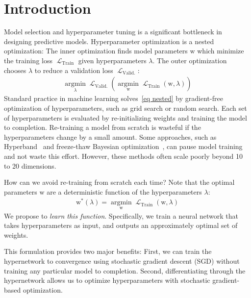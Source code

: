 \documentclass{article} %
\newcommand{\argmin}{\mathop{\mathrm{argmin}}\limits}
\newcommand{\param}{\mathrm{w}} %
\newcommand{\hyper}{\lambda} %
\newcommand{\hyperHyper}{\hyper'} %
\newcommand{\innerOptParam}[1]{\param^{*} \! \left( #1 \right)} %
\newcommand{\lossSymbol}{\mathop{\mathcal{L}}} %
\newcommand{\lossSymbolInner}{\lossSymbol_{\mathrm{Train}}} %
\newcommand{\lossSymbolOuter}{\lossSymbol_{\mathrm{Valid.}}} %
\newcommand{\innerLoss}[2]{\lossSymbolInner \! \left( #1, #2 \right)} %
\newcommand{\innerOpt}{\argmin_{\param} \innerLoss{\param}{\hyper}} %
\newcommand{\outerLoss}[1]{\lossSymbolOuter \! \left( #1 \right)}%
\newcommand{\outerOpt}[1]{\argmin_{\hyper} \outerLoss{#1}} %
\begin{document}
\section{Introduction}
Model selection and hyperparameter tuning is a significant bottleneck in designing predictive models.
Hyperparameter optimization is a nested optimization:
The inner optimization finds model parameters $\param$ which minimize the training loss $\lossSymbolInner$ given hyperparameters $\hyper$.
The outer optimization chooses $\hyper$ to reduce a validation loss $\lossSymbolOuter$:
%
\begin{align}
\outerOpt{\innerOpt}
\label{eq nested}
\end{align}
%
Standard practice in machine learning solves~\eqref{eq nested} by gradient-free optimization of hyperparameters, such as grid search or random search.
Each set of hyperparameters is evaluated by re-initializing weights and training the model to completion.
Re-training a model from scratch is wasteful if the hyperparameters change by a small amount.
Some approaches, such as Hyperband~\citep{li2016hyperband} and freeze-thaw Bayesian optimization~\citep{swersky2014freeze}, can pause model training and not waste this effort.
However, these methods often scale poorly beyond 10 to 20 dimensions.

How can we avoid re-training from scratch each time?
Note that the optimal parameters $\param$ are a deterministic function of the hyperparameters $\hyper$:
%
\begin{align}
\innerOptParam{\hyper} = \innerOpt
\label{best response equation}
\end{align}
%
We propose to \emph{learn this function}.
Specifically, we train a neural network that takes hyperparameters as input, and outputs an approximately optimal set of weights.

This formulation provides two major benefits:
First, we can train the hypernetwork to convergence using stochastic gradient descent (SGD) without training any particular model to completion.
Second, differentiating through the hypernetwork allows us to optimize hyperparameters with stochastic gradient-based optimization.
%
\end{document}
